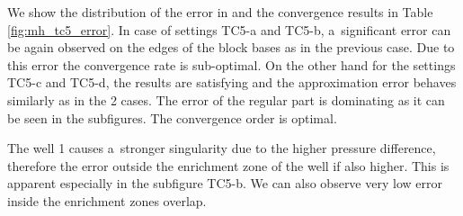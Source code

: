 We show the distribution of the error in  and the convergence results in Table \ref{fig:mh_tc5_error}.
In case of settings TC5-a and TC5-b, a~significant error can be again observed on the edges of the block bases as in the previous case.
Due to this error the convergence rate is sub-optimal.
On the other hand for the settings TC5-c and TC5-d, the results are satisfying and the approximation error behaves similarly
as in the 2 cases. The error of the regular part is dominating as it can be seen in the subfigures. The convergence order 
is optimal.

The well 1 causes a~stronger singularity due to the higher pressure difference,
therefore the error outside the enrichment zone of the well if also higher.
This is apparent especially in the subfigure TC5-b. We can also observe very low error
inside the enrichment zones overlap.

